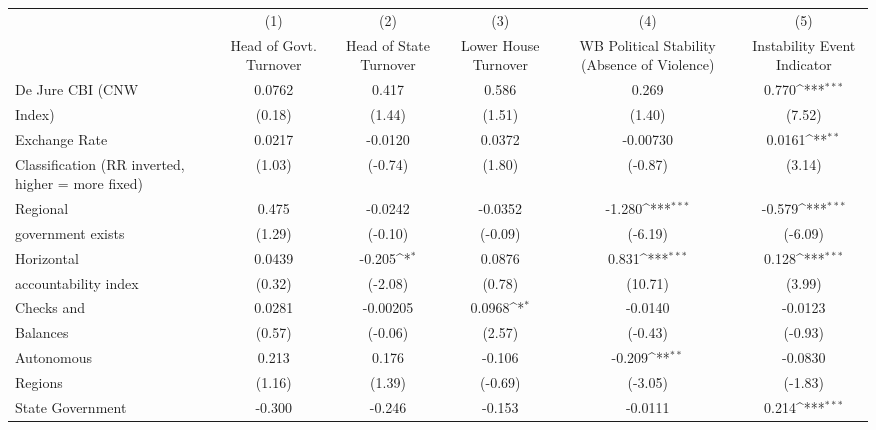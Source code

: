 {
\def\sym#1{\ifmmode^{#1}\else\(^{#1}\)\fi}
\begin{tabular}{l*{5}{c}}
\toprule
                &\multicolumn{1}{c}{(1)}&\multicolumn{1}{c}{(2)}&\multicolumn{1}{c}{(3)}&\multicolumn{1}{c}{(4)}&\multicolumn{1}{c}{(5)}\\
                &\multicolumn{1}{c}{Head of Govt. Turnover}&\multicolumn{1}{c}{Head of State Turnover}&\multicolumn{1}{c}{Lower House Turnover}&\multicolumn{1}{c}{WB Political Stability (Absence of Violence)}&\multicolumn{1}{c}{Instability Event Indicator}\\
\midrule
De Jure CBI (CNW&   0.0762         &    0.417         &    0.586         &    0.269         &    0.770\sym{***}\\
Index)          &   (0.18)         &   (1.44)         &   (1.51)         &   (1.40)         &   (7.52)         \\
\addlinespace
Exchange Rate   &   0.0217         &  -0.0120         &   0.0372         & -0.00730         &   0.0161\sym{**} \\
Classification (RR inverted, higher = more fixed)&   (1.03)         &  (-0.74)         &   (1.80)         &  (-0.87)         &   (3.14)         \\
\addlinespace
Regional        &    0.475         &  -0.0242         &  -0.0352         &   -1.280\sym{***}&   -0.579\sym{***}\\
government exists   &   (1.29)         &  (-0.10)         &  (-0.09)         &  (-6.19)         &  (-6.09)         \\
\addlinespace
Horizontal      &   0.0439         &   -0.205\sym{*}  &   0.0876         &    0.831\sym{***}&    0.128\sym{***}\\
accountability index&   (0.32)         &  (-2.08)         &   (0.78)         &  (10.71)         &   (3.99)         \\
\addlinespace
Checks and      &   0.0281         & -0.00205         &   0.0968\sym{*}  &  -0.0140         &  -0.0123         \\
Balances        &   (0.57)         &  (-0.06)         &   (2.57)         &  (-0.43)         &  (-0.93)         \\
\addlinespace
Autonomous      &    0.213         &    0.176         &   -0.106         &   -0.209\sym{**} &  -0.0830         \\
Regions         &   (1.16)         &   (1.39)         &  (-0.69)         &  (-3.05)         &  (-1.83)         \\
\addlinespace
State Government&   -0.300         &   -0.246         &   -0.153         &  -0.0111         &    0.214\sym{***}\\

\end{tabular}}
